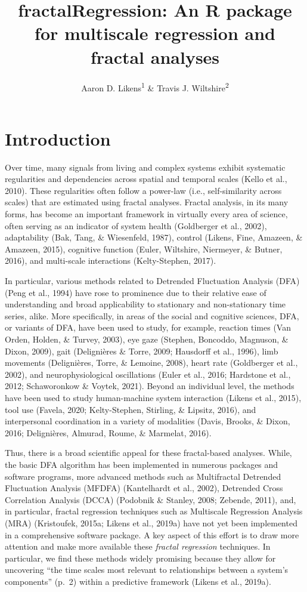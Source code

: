 \documentclass[
  man]{apa6}
\title{fractalRegression: An R package for multiscale regression and fractal analyses}
\author{Aaron D. Likens\textsuperscript{1} \& Travis J. Wiltshire\textsuperscript{2}}
\date{}
\affiliation{\vspace{0.5cm}\textsuperscript{1} Department of Biomechanics, University of Nebraska at Omaha\\\textsuperscript{2} Department of Cognitive Science \& Artificial Intelligence, Tilburg University}
\begin{document}
\maketitle

\hypertarget{introduction}{%
\section{Introduction}\label{introduction}}

Over time, many signals from living and complex systems exhibit
systematic regularities and dependencies across spatial and temporal
scales (Kello et al., 2010). These regularities often follow
a power-law (i.e., self-similarity across scales) that are estimated
using fractal analyses. Fractal analysis, in its many forms, has become
an important framework in virtually every area of science, often serving
as an indicator of system health
(Goldberger et al., 2002), adaptability
(Bak, Tang, \& Wiesenfeld, 1987), control
(Likens, Fine, Amazeen, \& Amazeen, 2015), cognitive function
(Euler, Wiltshire, Niermeyer, \& Butner, 2016), and multi-scale interactions
(Kelty-Stephen, 2017).

In particular, various methods related to Detrended Fluctuation Analysis
(DFA) (Peng et al., 1994) have rose to prominence due to
their relative ease of understanding and broad applicability to
stationary and non-stationary time series, alike. More specifically, in
areas of the social and cognitive sciences, DFA, or variants of DFA,
have been used to study, for example, reaction times
(Van Orden, Holden, \& Turvey, 2003), eye gaze
(Stephen, Boncoddo, Magnuson, \& Dixon, 2009), gait
(Delignières \& Torre, 2009; Hausdorff et al., 1996), limb movements
(Delignières, Torre, \& Lemoine, 2008), heart rate
(Goldberger et al., 2002), and neurophysiological
oscillations (Euler et al., 2016; Hardstone et al., 2012; Schaworonkow \& Voytek, 2021). Beyond an individual level, the
methods have been used to study human-machine system interaction
(Likens et al., 2015), tool use
(Favela, 2020; Kelty-Stephen, Stirling, \& Lipsitz, 2016), and interpersonal coordination
in a variety of modalities
(Davis, Brooks, \& Dixon, 2016; Delignières, Almurad, Roume, \& Marmelat, 2016).

Thus, there is a broad scientific appeal for these fractal-based
analyses. While, the basic DFA algorithm has been implemented in
numerous packages and software programs, more advanced methods such as
Multifractal Detrended Fluctuation Analysis (MFDFA)
(Kantelhardt et al., 2002), Detrended Cross
Correlation Analysis (DCCA)
(Podobnik \& Stanley, 2008; Zebende, 2011), and, in particular,
fractal regression techniques such as Multiscale Regression Analysis
(MRA) (Kristoufek, 2015a; Likens et al., 2019a) have not yet been
implemented in a comprehensive software package. A key aspect of this
effort is to draw more attention and make more available these \emph{fractal
regression} techniques. In particular, we find these methods widely
promising because they allow for uncovering ``the time scales most
relevant to relationships between a system's components'' (p.~2) within a
predictive framework (Likens et al., 2019a).
\end{document}
